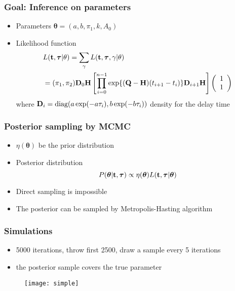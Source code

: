 \documentclass[11pt]{beamer}
\newcommand{\bit}{\begin{itemize}\setlength{\itemsep}{0cm}\setlength{\topsep}{0cm}}
\newcommand{\eit}{\end{itemize}}
\newcommand{\bQ}{{\bf Q}}
\newcommand{\bH}{{\bf H}}
\newcommand{\bD}{{\bf D}}
\newcommand{\btheta}{{\boldsymbol{\theta}}}
\newcommand{\btau}{{\boldsymbol{\tau}}}
\newcommand{\bt}{{\bf t}}
\begin{document}
\begin{frame}
\frametitle{Goal: Inference on parameters}
\bit
\item Parameters $\btheta=(a,b,\pi_1,k,A_0)$
\item Likelihood function 
\begin{align*}
& L(\bt,\btau|\theta)=\sum_{\gamma}L(\bt,\btau,\gamma|\theta)\\
& =(\pi_1,\pi_2)\bD_0\bH\left[\prod_{i=0}^{n-1}\exp\{(\bQ-\bH)(t_{i+1}- t_i)\}\bD_{i+1}\bH\right]\left(\begin{array}{c}
1\\
1
\end{array}\right)
\end{align*}
where 	$\bD_i=\mbox{diag}(a\exp(-a\tau_i),b\exp(-b\tau_i))$ density for the delay time
\eit
\end{frame}


\begin{frame}
\frametitle{Posterior sampling by MCMC}
\bit
\item $\eta(\btheta)$ be the prior distribution 
\item Posterior distribution
$$P(\btheta|\bt,\btau)\propto\eta(\btheta)L(\bt,\btau|\btheta)$$ 
\item Direct sampling is impossible
\item The posterior can be sampled by Metropolis-Hasting algorithm
\eit
\end{frame}

\begin{frame}
\frametitle{Simulations}
\bit
\item 5000 iterations, throw first 2500, draw a sample every 5 iterations
\item the posterior sample covers the true parameter 
\eit
	\begin{figure}
		\centering
		\texttt{[image: simple]}
	\end{figure}
\end{frame}
\end{document}
